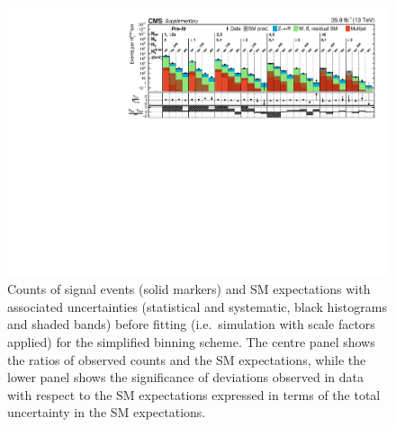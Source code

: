\begin{figure}[h!]
  \centering
  \includegraphics[width=0.95\linewidth]{Supplementary/SimplifiedBinning_results_no-fit_aux} 
  \caption{Counts of signal events (solid markers) and SM expectations
    with associated uncertainties (statistical and systematic, black
    histograms and shaded bands) 
    before fitting (i.e.\ simulation with scale factors applied)
    for the simplified binning scheme.
    The centre panel shows the ratios of
    observed counts and the SM expectations, while the lower panel
    shows the significance of deviations observed in data with respect
    to the SM expectations expressed in terms of the total uncertainty
    in the SM expectations.
    }
  \label{fig:aggregated_results}
\end{figure}


